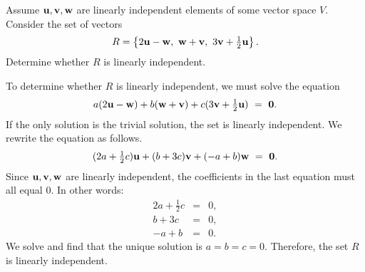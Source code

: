 \begin{ex}
  Assume $\mbox{\bf u},\mbox{\bf v},\mbox{\bf w}$ are linearly independent
  elements of some vector space $V$. Consider the set of vectors
  \begin{equation*}
    \textstyle
    R = \left\{2\mbox{\bf u} - \mbox{\bf w},~
      \mbox{\bf w} + \mbox{\bf v},~
      3\mbox{\bf v} + \frac{1}{2} \mbox{\bf u} \right\}.
  \end{equation*}
  Determine whether $R$ is linearly independent.

  \begin{sol}
    To determine whether $R$ is linearly independent, we must solve
    the equation
    \begin{equation*}
      \textstyle
      a(2\mbox{\bf u} - \mbox{\bf w}) + b(\mbox{\bf w} + \mbox{\bf v}) + c( 3\mbox{\bf v} +
      \frac{1}{2}\mbox{\bf u}) ~=~ \mbox{\bf 0}.
    \end{equation*}
    If the only solution is the trivial solution, the set is linearly
    independent. We rewrite the
    equation as follows.
    \begin{equation*}
      \textstyle
      (2a + \frac{1}{2}c) \mbox{\bf u} + (b+3c)\mbox{\bf v} + (-a + b) \mbox{\bf w} ~=~ \mbox{\bf 0}.
    \end{equation*}
    Since $\mbox{\bf u},\mbox{\bf v},\mbox{\bf w}$ are linearly independent, the
    coefficients in the last equation must all equal $0$.
    In other words:
    \begin{eqnarray*}
      \textstyle
      2a + \frac{1}{2} c &=& 0, \\
      b + 3c &=& 0, \\
      -a + b &=& 0.
    \end{eqnarray*}
    We solve and find that the unique solution is
    $a=b=c=0$. Therefore, the set $R$ is linearly independent.
  \end{sol}
\end{ex}

